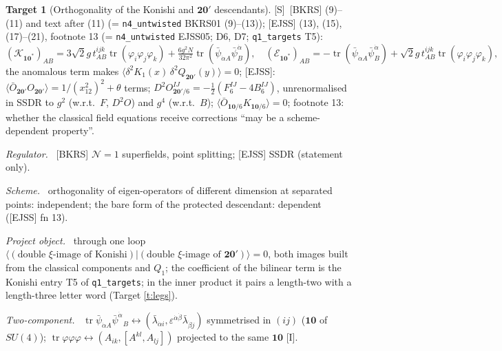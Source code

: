 \documentclass[11pt]{article}
\theoremstyle{definition}
\newtheorem{target}{Target}
\newcommand{\tr}{\operatorname{tr}}
\newcommand{\Sl}{\textup{[S]}}
\newcommand{\Il}{\textup{[I]}}
\newcommand{\fld}[1]{\par\textit{#1.}\ }
\begin{document}
\begin{target}[Orthogonality of the Konishi and $\mathbf{20'}$ descendants]\label{t:orth}
\Sl\ [BKRS] (9)--(11) and text after (11) (= \texttt{n4\_untwisted} BKRS01 (9)--(13)); [EJSS] (13), (15), (17)--(21), footnote 13 (= \texttt{n4\_untwisted} EJSS05; D6, D7; \texttt{q1\_targets} T5):
\[
(\mathcal K_{\mathbf{10}^*})_{AB}=3\sqrt2g\,t^{ijk}_{AB}\tr(\varphi_i\varphi_j\varphi_k)+\tfrac{6g^2N}{32\pi^2}\tr(\bar\psi_{\dot\alpha A}\bar\psi^{\dot\alpha}_B),\quad(\mathcal E_{\mathbf{10}^*})_{AB}=-\tr(\bar\psi_{\dot\alpha A}\bar\psi^{\dot\alpha}_B)+\sqrt2g\,t^{ijk}_{AB}\tr(\varphi_i\varphi_j\varphi_k),
\]
the anomalous term makes $\langle\delta^2K_1(x)\,\delta^2Q_{\mathbf{20'}}(y)\rangle=0$; [EJSS]: $\langle\bar O_{\mathbf{20'}}O_{\mathbf{20'}}\rangle=1/(x_{12}^2)^2+\theta$ terms; $D^2O^{IJ}_{\mathbf{20'}/6}=-\tfrac12(F_6^{IJ}-4B_6^{IJ})$, unrenormalised in SSDR to $g^2$ (w.r.t.\ $F$, $D^2O$) and $g^4$ (w.r.t.\ $B$); $\langle\bar O_{\mathbf{10}/6}K_{\mathbf{10}/6}\rangle=0$; footnote 13: whether the classical field equations receive corrections ``may be a scheme-dependent property''.
\fld{Regulator} [BKRS] $\mathcal N=1$ superfields, point splitting; [EJSS] SSDR (statement only).
\fld{Scheme} orthogonality of eigen-operators of different dimension at separated points: independent; the bare form of the protected descendant: dependent ([EJSS] fn 13).
\fld{Project object} through one loop $\langle(\text{double }\xi\text{-image of Konishi})|(\text{double }\xi\text{-image of }\mathbf{20'})\rangle=0$, both images built from the classical components and $Q_1$; the coefficient of the bilinear term is the Konishi entry T5 of \texttt{q1\_targets}; in the inner product it pairs a length-two with a length-three letter word (Target \ref{t:legs}).
\fld{Two-component} $\tr\bar\psi_{\dot\alpha A}\bar\psi^{\dot\alpha}{}_B\leftrightarrow(\bar\lambda_{\dot\alpha i},\varepsilon^{\dot\alpha\dot\beta}\bar\lambda_{\dot\beta j})$ symmetrised in $(ij)$ ($\mathbf{10}$ of $SU(4)$); $\tr\varphi\varphi\varphi\leftrightarrow(A_{ik},[A^{kl},A_{lj}])$ projected to the same $\mathbf{10}$ \Il.
\end{target}
\end{document}
